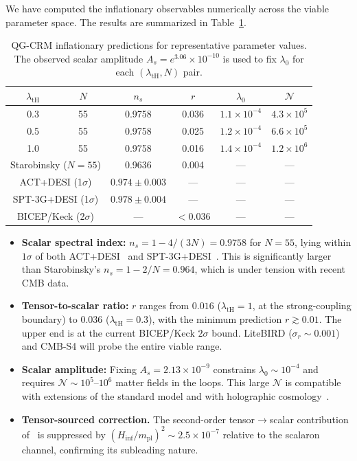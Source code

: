 \documentclass[aps,prd,twocolumn,superscriptaddress,nofootinbib]{revtex4-2}
\begin{document}
We have computed the inflationary observables numerically across the viable parameter space. The results are summarized in Table~\ref{tab:observables}.

\begin{table}[h]
\caption{QG-CRM inflationary predictions for representative parameter values. The observed scalar amplitude $A_s = e^{3.06} \times 10^{-10}$ is used to fix $\lambda_0$ for each $(\lambda_\mathrm{tH}, N)$ pair.}
\scriptsize
\setlength{\tabcolsep}{2pt}
\begin{tabular}{cccccc}
\toprule
$\lambda_\mathrm{tH}$ & $N$ & $n_s$ & $r$ & $\lambda_0$ & $\mathcal{N}$ \\
\midrule
0.3 & 55 & 0.9758 & 0.036 & $1.1 \times 10^{-4}$ & $4.3 \times 10^5$ \\
0.5 & 55 & 0.9758 & 0.025 & $1.2 \times 10^{-4}$ & $6.6 \times 10^5$ \\
1.0 & 55 & 0.9758 & 0.016 & $1.4 \times 10^{-4}$ & $1.2 \times 10^6$ \\
\midrule
\multicolumn{2}{c}{Starobinsky ($N=55$)} & 0.9636 & 0.004 & --- & --- \\
\multicolumn{2}{c}{ACT+DESI (1$\sigma$)} & $0.974 \pm 0.003$ & --- & --- & --- \\
\multicolumn{2}{c}{SPT-3G+DESI (1$\sigma$)} & $0.978 \pm 0.004$ & --- & --- & --- \\
\multicolumn{2}{c}{BICEP/Keck (2$\sigma$)} & --- & $<0.036$ & --- & --- \\
\bottomrule
\end{tabular}
\label{tab:observables}
\end{table}

\begin{itemize}
\item \textbf{Scalar spectral index:} $n_s = 1 - 4/(3N) = 0.9758$ for $N = 55$, lying within $1\sigma$ of both ACT+DESI~\cite{ACT2025} and SPT-3G+DESI~\cite{SPT3G2026}. This is significantly larger than Starobinsky's $n_s = 1 - 2/N = 0.964$, which is under tension with recent CMB data.

\item \textbf{Tensor-to-scalar ratio:} $r$ ranges from $0.016$ ($\lambda_\mathrm{tH} = 1$, at the strong-coupling boundary) to $0.036$ ($\lambda_\mathrm{tH} = 0.3$), with the minimum prediction $r \gtrsim 0.01$. The upper end is at the current BICEP/Keck $2\sigma$ bound. LiteBIRD ($\sigma_r \sim 0.001$) and CMB-S4 will probe the entire viable range.

\item \textbf{Scalar amplitude:} Fixing $A_s = 2.13 \times 10^{-9}$ constrains $\lambda_0 \sim 10^{-4}$ and requires $\mathcal{N} \sim 10^5$--$10^6$ matter fields in the loops. This large $\mathcal{N}$ is compatible with extensions of the standard model and with holographic cosmology~\cite{Afshordi2017}.

\item \textbf{Tensor-sourced correction.} The second-order tensor$\to$scalar contribution of~\cite{Bertacca2025} is suppressed by $(H_\mathrm{inf}/m_\mathrm{pl})^2 \sim 2.5 \times 10^{-7}$ relative to the scalaron channel, confirming its subleading nature.
\end{itemize}
\end{document}
